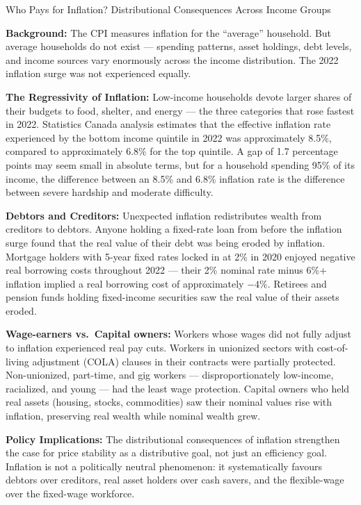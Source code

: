 \begin{casestudy}{Who Pays for Inflation? Distributional Consequences Across Income Groups}

\textbf{Background:} The CPI measures inflation for the ``average'' household.
But average households do not exist --- spending patterns, asset holdings,
debt levels, and income sources vary enormously across the income distribution.
The 2022 inflation surge was not experienced equally.

\textbf{The Regressivity of Inflation:} Low-income households devote larger
shares of their budgets to food, shelter, and energy --- the three categories
that rose fastest in 2022. Statistics Canada analysis estimates that the
effective inflation rate experienced by the bottom income quintile in
2022 was approximately 8.5\%, compared to approximately 6.8\% for the top
quintile. A gap of 1.7 percentage points may seem small in absolute terms,
but for a household spending 95\% of its income, the difference between
an 8.5\% and 6.8\% inflation rate is the difference between severe hardship
and moderate difficulty.

\textbf{Debtors and Creditors:} Unexpected inflation redistributes wealth
from creditors to debtors. Anyone holding a fixed-rate loan from before
the inflation surge found that the real value of their debt was being
eroded by inflation. Mortgage holders with 5-year fixed rates locked in
at 2\% in 2020 enjoyed negative real borrowing costs throughout 2022 ---
their 2\% nominal rate minus 6\%+ inflation implied a real borrowing cost
of approximately $-4\%$. Retirees and pension funds holding fixed-income
securities saw the real value of their assets eroded.

\textbf{Wage-earners vs.\ Capital owners:} Workers whose wages did not
fully adjust to inflation experienced real pay cuts. Workers in unionized
sectors with cost-of-living adjustment (COLA) clauses in their contracts
were partially protected. Non-unionized, part-time, and gig workers ---
disproportionately low-income, racialized, and young --- had the least
wage protection. Capital owners who held real assets (housing, stocks,
commodities) saw their nominal values rise with inflation, preserving
real wealth while nominal wealth grew.

\textbf{Policy Implications:} The distributional consequences of inflation
strengthen the case for price stability as a distributive goal, not just
an efficiency goal. Inflation is not a politically neutral phenomenon:
it systematically favours debtors over creditors, real asset holders
over cash savers, and the flexible-wage over the fixed-wage workforce.
\end{casestudy}

